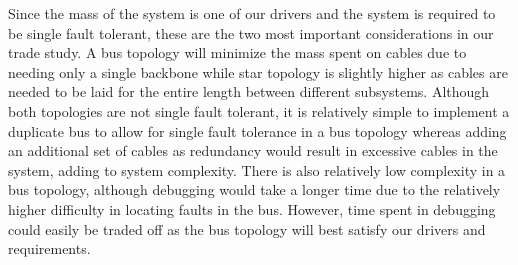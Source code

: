 Since the mass of the system is one of our drivers and the system is required to be single fault tolerant, these are the two most important considerations in our trade study. A bus topology will minimize the mass spent on cables due to needing only a single backbone while star topology is slightly higher as cables are needed to be laid for the entire length between different subsystems. Although both topologies are not single fault tolerant, it is relatively simple to implement a duplicate bus to allow for single fault tolerance in a bus topology whereas adding an additional set of cables as redundancy would result in excessive cables in the system, adding to system complexity. There is also relatively low complexity in a bus topology, although debugging would take a longer time due to the relatively higher difficulty in locating faults in the bus. However, time spent in debugging could easily be traded off as the bus topology will best satisfy our drivers and requirements.

